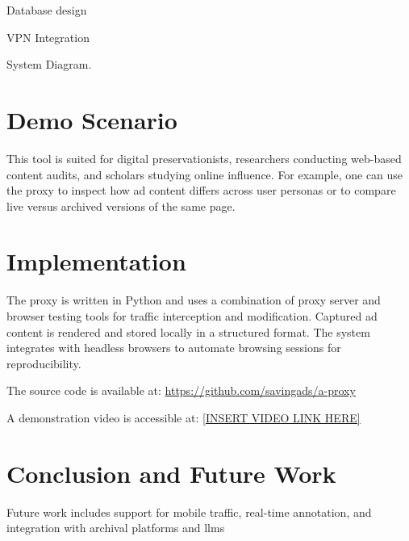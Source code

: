 \documentclass[sigconf]{acmart}
\begin{document}
Database design

VPN Integration

System Diagram.

\section{Demo Scenario}
This tool is suited for digital preservationists, researchers conducting web-based content audits, and scholars studying online influence. For example, one can use the proxy to inspect how ad content differs across user personas or to compare live versus archived versions of the same page.

\section{Implementation}
The proxy is written in Python and uses a combination of proxy server and browser testing tools for traffic interception and modification. Captured ad content is rendered and stored locally in a structured format. The system integrates with headless browsers to automate browsing sessions for reproducibility.

The source code is available at: \url{https://github.com/savingads/a-proxy}

A demonstration video is accessible at: \url{[INSERT VIDEO LINK HERE]}

\section{Conclusion and Future Work}
Future work includes support for mobile traffic, real-time annotation, and integration with archival platforms and llms



\end{document}
